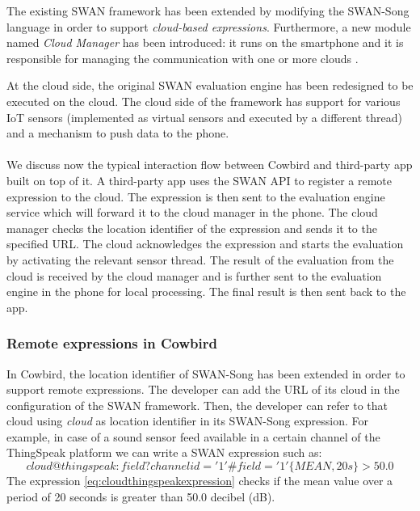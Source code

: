 The existing SWAN framework has been extended by modifying the SWAN-Song language in order to support \emph{cloud-based expressions}. Furthermore, a new module named \emph{Cloud Manager} has been introduced: it runs on the smartphone and it is responsible for managing the communication with one or more clouds \cite{cowbirdarticle}. 

At the cloud side, the original SWAN evaluation engine has been redesigned to be executed on the cloud. The cloud side of the framework has support for various IoT sensors (implemented as virtual sensors and executed by a different thread) and a mechanism to push data to the phone.

\paragraph{}
We discuss now the typical interaction flow between Cowbird and  third-party app built on top of it. A third-party app uses the SWAN API to register a remote expression to the cloud. The expression is then sent to the evaluation engine service which will forward it to the cloud manager in the phone. The cloud manager checks the location identifier of the expression and sends it to the specified URL. The cloud acknowledges the expression and starts the evaluation by activating the relevant sensor thread. The result of the evaluation from the cloud is received by the cloud manager and is further sent to the evaluation engine in the phone for local processing. The final result is then sent back to the app.

\subsubsection{Remote expressions in Cowbird}
In Cowbird, the location identifier of SWAN-Song has been extended in order to support remote expressions. The developer can add the URL of its cloud in the configuration of the SWAN framework. Then, the developer can refer to that cloud using \emph{cloud} as location identifier in its SWAN-Song expression. For example, in case of a sound sensor feed available in a certain channel of the ThingSpeak platform \cite{thingspeakonline} we can write a SWAN expression such as:
\begin{equation} \label{eq:cloudthingspeakexpression}
cloud@thingspeak:field?channelid='1'\#field='1'\big\{MEAN,20s\big\} > 50.0
\end{equation}
The expression \ref{eq:cloudthingspeakexpression} checks if the mean value over a period of 20 seconds is greater than 50.0 decibel (dB). 

